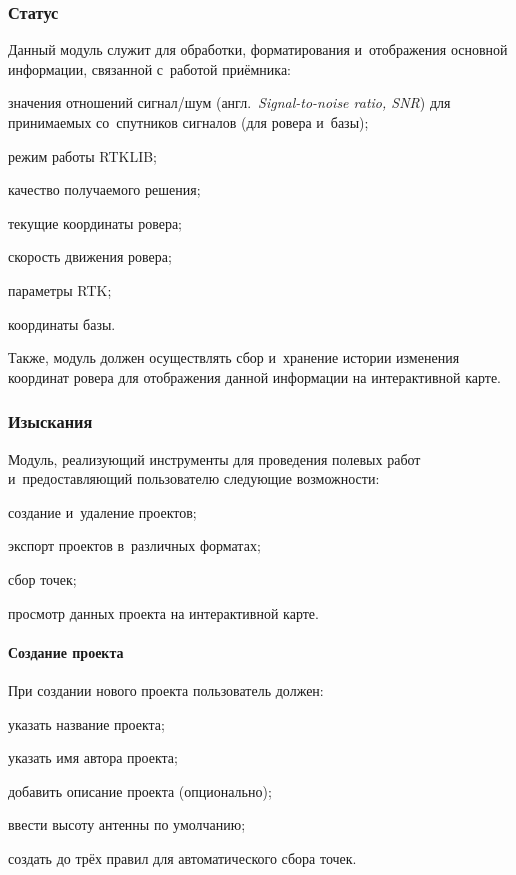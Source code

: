 \subsubsection{Статус}

Данный модуль служит для обработки, форматирования и~отображения основной информации, связанной с~работой приёмника:
\begin{dashitemize}
  \item значения отношений сигнал/шум (англ.~\emph{Signal-to-noise ratio, SNR}) для принимаемых со~спутников сигналов (для ровера и~базы);
  \item режим работы RTKLIB;
  \item качество получаемого решения;
  \item текущие координаты ровера;
  \item скорость движения ровера;
  \item параметры RTK;
  \item координаты базы.
\end{dashitemize}

Также, модуль должен осуществлять сбор и~хранение истории изменения координат ровера для отображения данной информации на интерактивной карте.


\subsubsection{Изыскания}
\label{subsec:survey-requirements}

Модуль, реализующий инструменты для проведения полевых работ и~предоставляющий пользователю следующие возможности:
\begin{dashitemize}
  \item создание и~удаление проектов;
  \item экспорт проектов в~различных форматах;
  \item сбор точек;
  \item просмотр данных проекта на интерактивной карте.
\end{dashitemize}

\paragraph{Создание проекта}

При создании нового проекта пользователь должен:
\begin{dashitemize}
  \item указать название проекта;
  \item указать имя автора проекта;
  \item добавить описание проекта (опционально);
  \item ввести высоту антенны по умолчанию;
  \item создать до трёх правил для автоматического сбора точек.
\end{dashitemize}

